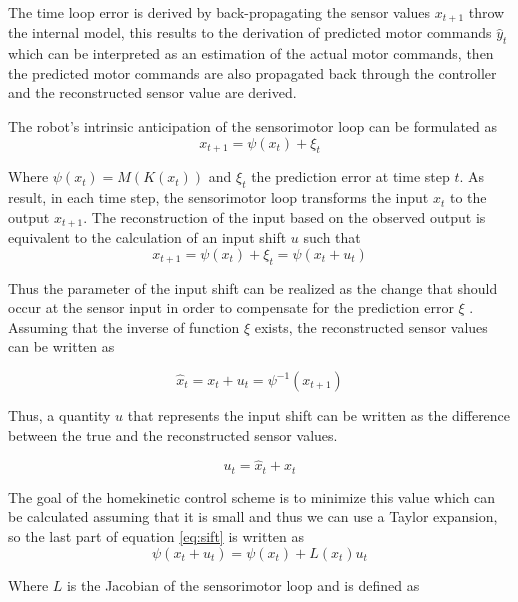\documentclass[msc,ai,logo]{infthesis}
\begin{document}
The time loop error is derived by back-propagating the sensor values $x_{t+1}$ throw the internal model, this results to the derivation of predicted motor commands $\hat{y}_t$ which can be interpreted as an estimation of the actual motor commands, then the predicted motor commands are also propagated back through the controller and the reconstructed sensor value are derived.

The robot's intrinsic anticipation of the sensorimotor loop can be formulated as 
\begin{equation}
x_{t+1}=\psi(x_{t})+\xi_{t}
\end{equation}
 
Where  $\psi(x_{t}) = M(K(x_{t}))$ and $\xi_{t}$ the prediction error at time step $t$. As result, in each time step, the sensorimotor loop transforms the input $x_{t}$ to the  output $x_{t+1}$. The reconstruction of the input based on the observed output is equivalent to 
the calculation of an input shift $u$ such that 
\begin{equation}
x_{t+1}=\psi(x_{t})+\xi_{t}=\psi(x_{t}+ u_{t})
\label{eq:sift}
\end{equation}


Thus the parameter of the input shift can be realized as the change that should occur at the sensor input in order to compensate for the prediction error $\xi$ \citep[p.~42]{martius:diss10}. Assuming that the inverse of function $\xi$ exists, the reconstructed sensor values can be written as

\begin{equation}
\hat{x}_{t}=x_{t}+u_{t}=\psi^{-1}(x_{t+1})
\end{equation}  

Thus, a quantity $u$ that represents the input shift can be written as the difference between the true and the reconstructed sensor values. 

\begin{equation}
u_{t}=\hat{x}_{t}+x_{t}
\end{equation}  

The goal of the homekinetic control scheme is to minimize this value which can be calculated assuming that it is small and thus we can use a Taylor expansion, so the last part of equation \ref{eq:sift} is written as  
\begin{equation}
\psi(x_{t}+ u_{t})=\psi(x_{t})+L(x_{t})u_{t}
\label{eq:taylor}
\end{equation}

Where $L$ is the Jacobian of the sensorimotor loop and is defined as 
 
\end{document}
